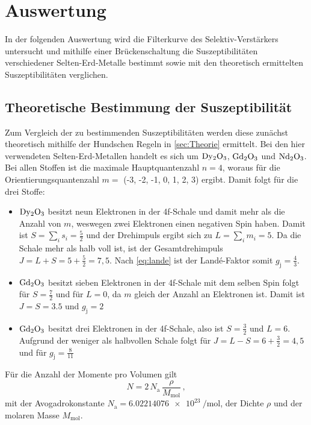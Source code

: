 \section{Auswertung}
\label{sec:Auswertung}

In der folgenden Auswertung wird die Filterkurve des Selektiv-Verstärkers untersucht
und mithilfe einer Brückenschaltung die Suszeptibilitäten verschiedener Selten-Erd-Metalle bestimmt
sowie mit den theoretisch ermittelten Suszeptibilitäten verglichen.


\subsection{Theoretische Bestimmung der Suszeptibilität}

Zum Vergleich der zu bestimmenden Suszeptibilitäten werden diese zunächst theoretisch mithilfe der Hundschen Regeln in \autoref{sec:Theorie} ermittelt.
Bei den hier verwendeten Selten-Erd-Metallen handelt es sich um $\ce{Dy2O3}$, $\ce{Gd2O3}$ und $\ce{Nd2O3}$.
Bei allen Stoffen ist die maximale Hauptquantenzahl $n = 4$, woraus für die Orientierungsquantenzahl $m =$ (-3, -2, -1, 0, 1, 2, 3) ergibt. 
Damit folgt für die drei Stoffe:

\begin{itemize}
  \item $\ce{Dy2O3}$ besitzt neun Elektronen in der 4f-Schale und damit mehr als die Anzahl von $m$, weswegen zwei Elektronen einen negativen Spin haben.
        Damit ist $ S = \sum_{i} s_i = \frac{5}{2}$ und der Drehimpuls ergibt sich zu $L = \sum_i m_i = 5$.
        Da die Schale mehr als halb voll ist, ist der Gesamtdrehimpuls $J = L + S = 5 + \frac{5}{2} = 7,5$.
        Nach \autoref{eq:lande} ist der Landé-Faktor somit $g_\text{j} = \frac{4}{3}$.

  \item $\ce{Gd2O3}$ besitzt sieben Elektronen in der 4f-Schale mit dem selben Spin folgt für $S = \frac{7}{2}$ und für $L = 0$, da $m$ gleich der Anzahl an Elektronen ist.
        Damit ist $J = S = 3.5$ und $g_\text{j} = 2$

  \item $\ce{Gd2O3}$ besitzt drei Elektronen in der 4f-Schale, also ist $S = \frac{3}{2}$ und $L = 6$.
        Aufgrund der weniger als halbvollen Schale folgt für $J = L - S = 6 + \frac{3}{2} = 4,5$ und für $g_\text{j} = \frac{8}{11}$
\end{itemize}

Für die Anzahl der Momente pro Volumen gilt
\begin{equation}
  N = 2 \, N_\text{a} \, \frac{\rho}{M_\text{mol}} \, ,
\end{equation}
mit der Avogadrokonstante $N_\text{a} = \qty{6.02214076e23}{\per\mol}$, der Dichte $\rho$ und der molaren Masse $M_\text{mol}$.

